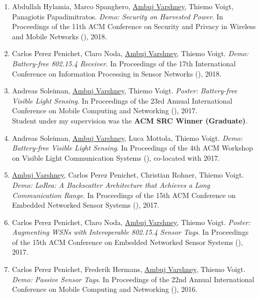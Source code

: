\begin{enumerate}
\item Abdullah Hylamia\pg, Marco Spanghero, \underline{Ambuj Varshney}, Thiemo Voigt, Panagiotis Papadimitratos. 
\emph{Demo: Security on Harvested Power}. 
In Proceedings of the 11th ACM Conference on Security and Privacy in Wireless and Mobile Networks (), 2018.

\item Carlos Perez Penichet, Claro Noda, \underline{Ambuj Varshney}, Thiemo Voigt. 
\emph{Demo: Battery-free 802.15.4 Receiver}. 
In Proceedings of the 17th International Conference on Information Processing in Sensor Networks (), 2018.


\item Andreas Soleiman\ug, \underline{Ambuj Varshney}, Thiemo Voigt. 
\emph{Poster: Battery-free Visible Light Sensing}. 
In Proceedings of the 23rd Annual International Conference on Mobile Computing and Networking (), 2017.\\
\textcolor{alert}{Student under my supervision was the \textbf{ACM SRC Winner (Graduate)}}.

\item Andreas Soleiman\ug, \underline{Ambuj Varshney}, Luca Mottola, Thiemo Voigt. 
\emph{Demo: Battery-free Visible Light Sensing}. 
In Proceedings of the 4th ACM Workshop on Visible Light Communication Systems (), co-located with  2017.

\item \underline{Ambuj Varshney}, Carlos Perez Penichet, Christian Rohner, Thiemo Voigt. 
\emph{Demo: LoRea: A Backscatter Architecture that Achieves a Long Communication Range}. 
In Proceedings of the 15th ACM Conference on Embedded Networked Sensor Systems (), 2017.

\item Carlos Perez Penichet, Claro Noda, \underline{Ambuj Varshney}, Thiemo Voigt. 
\emph{Poster: Augmenting WSNs with Interoperable 802.15.4 Sensor Tags}. 
In Proceedings of the 15th ACM Conference on Embedded Networked Sensor Systems (), 2017.


\item Carlos Perez Penichet, Frederik Hermans, \underline{Ambuj Varshney}, Thiemo Voigt. 
\emph{Demo: Passive Sensor Tags}. 
In Proceedings of the 22nd Annual International Conference on Mobile Computing and Networking (), 2016.


\end{enumerate}

